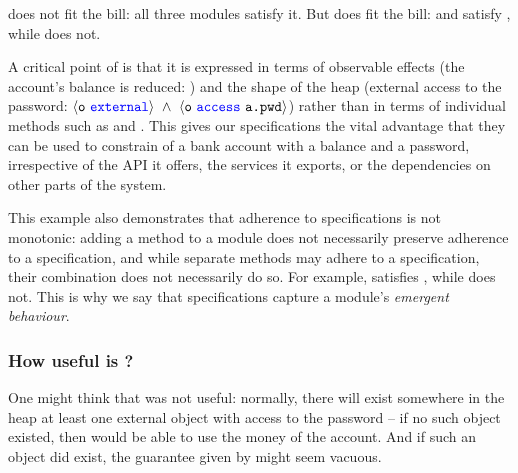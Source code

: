  
{\SrobustA does not fit the bill: all three modules   satisfy  it.
 But  \SrobustB does fit the bill: \ModA and \ModC satisfy \SrobustB, while \ModB does not.}
 
A critical point of \SrobustB %
is that it is
expressed in terms of observable effects (the account's balance is
reduced: ) and the shape of the heap 
(external access to the password:
$\external{\prg{o}}\ \wedge\ \access{\prg{o}}{\prg{a.pwd}}$) 
rather than in terms of individual methods such as
 and .
This gives our specifications the
vital advantage that they can be used to constrain
 of a bank account with a balance and a
password, irrespective of the API it
offers, the services it exports, or the dependencies on other parts of
the system.

 This example also demonstrates that 
adherence to   \Nec specifications is not monotonic:
adding a method to a module does not necessarily preserve adherence to
a specification, 
and while separate methods may adhere to a  specification, their combination does
not necessarily do so. 
{For example, \ModA satisfies \SrobustB, while \ModB does not.}
This is why we say that \Nec   specifications capture a module's \emph{emergent behaviour}. 
 

\subsubsection{How  useful is  \SrobustB?}
\label{sec:how}

{One might think that \SrobustB was not useful: normally, there will exist somewhere in the heap
at least one external object  
with access to the password --  if no such object existed, then  would be able to use the money of
the account.
And if such an object did exist, 
the guarantee given by \SrobustB might seem vacuous.}

